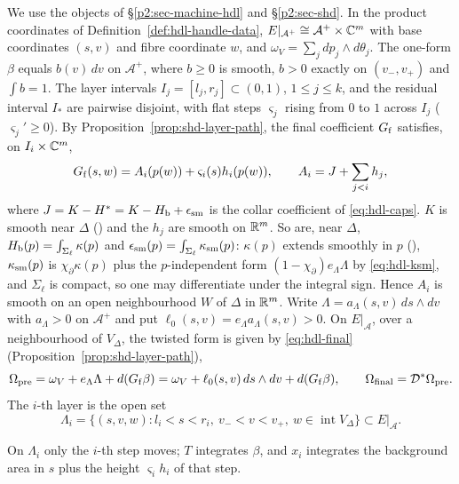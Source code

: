 We use the objects of \S\ref{p2:sec-machine-hdl} and \S\ref{p2:sec-shd}. In the product coordinates of
Definition~\ref{def:hdl-handle-data}, $E|_{\mathcal A^+}\cong\mathcal A^+\times\mathbb{C}^m$ with base coordinates $(s,v)$ and fibre
coordinate $w$, and $\omega_V=\sum_jdp_j\wedge d\theta_j$. The one-form $\beta$ equals $b(v)\,dv$ on $\mathcal A^+$, where $b\ge0$
is smooth, $b>0$ exactly on $(v_-,v_+)$ and $\int b=1$. The layer intervals $I_j=[l_j,r_j]\subset(0,1)$,
$1\le j\le k$, and the residual interval $I_*$ are pairwise disjoint, with flat steps $\varsigma_j$ rising from $0$ to $1$ across
$I_j$ ($\varsigma_j'\ge0$). By Proposition~\ref{prop:shd-layer-path}, the final coefficient $G_{\rm f}$ satisfies, on
$I_i\times\mathbb{C}^m$,
\begin{equation}\label{eq:str-Gf}
 G_{\rm f}(s,w)=A_i(p(w))+\varsigma_i(s)h_i(p(w)),\qquad A_i=J+\sum_{j<i}h_j ,
\end{equation}
where $J=K-H^*=K-H_{\mathrm b}+\epsilon_{\rm sm}$ is the collar coefficient of \eqref{eq:hdl-caps}. $K$ is smooth near $\Delta$
() and the $h_j$ are smooth on $\mathbb{R}^m$. So are, near $\Delta$, $H_{\mathrm b}(p)=\int_{\Sigma_\ell}\kappa(p)$
and $\epsilon_{\rm sm}(p)=\int_{\Sigma_\ell}\kappa_{\rm sm}(p)$: $\kappa(p)$ extends smoothly in $p$ (),
$\kappa_{\rm sm}(p)$ is $\chi_\partial\kappa(p)$ plus the $p$-independent form $(1-\chi_\partial)e_\Lambda\Lambda$ by
\eqref{eq:hdl-ksm}, and $\Sigma_\ell$ is compact, so one may differentiate under the integral sign. Hence $A_i$ is smooth
on an open neighbourhood $W$ of $\Delta$ in $\mathbb{R}^m$. Write $\Lambda=a_\Lambda(s,v)\,ds\wedge dv$ with $a_\Lambda>0$ on $\mathcal A^+$ and put
$\ell_0(s,v)=e_\Lambda a_\Lambda(s,v)>0$. On $E|_{\mathcal A}$, over a neighbourhood of $V_\Delta$, the twisted form is
given by \eqref{eq:hdl-final} (Proposition~\ref{prop:shd-layer-path}),
\begin{equation}\label{eq:str-pre}
 \Omega_{\rm pre}=\omega_V+e_\Lambda\Lambda+d(G_{\rm f}\beta)=\omega_V+\ell_0(s,v)\,ds\wedge dv+d(G_{\rm f}\beta),\qquad
 \Omega_{\rm final}=\mathcal D^*\Omega_{\rm pre}.
\end{equation}
The $i$-th layer is the open set
\[
 \Lambda_i=\{(s,v,w):l_i<s<r_i,\ v_-<v<v_+,\ w\in\operatorname{int}V_\Delta\}\subset E|_{\mathcal A}.
\]

On $\Lambda_i$ only the $i$-th step moves; $T$ integrates $\beta$, and $x_i$ integrates the background area in $s$ plus the
height $\varsigma_ih_i$ of that step.

